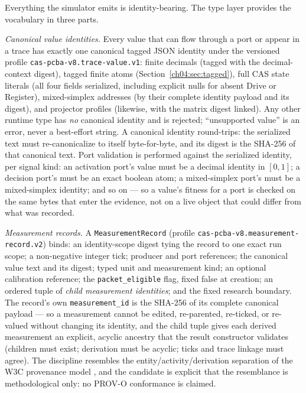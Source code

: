 Everything the simulator emits is identity-bearing. The type layer
provides the vocabulary in three parts.

\emph{Canonical value identities.} Every value that can flow through a
port or appear in a trace has exactly one canonical tagged JSON identity
under the versioned profile \texttt{cas-pcba-v8.trace-value.v1}: finite
decimals (tagged with the decimal-context digest), tagged finite atoms
(Section~\ref{ch04:sec:tagged}), full CAS state literals (all four fields
serialized, including explicit nulls for absent Drive or Register),
mixed-simplex addresses (by their complete identity payload and its
digest), and projector profiles (likewise, with the matrix digest linked).
Any other runtime type has \emph{no} canonical identity and is rejected;
``unsupported value'' is an error, never a best-effort string. A canonical
identity round-trips: the serialized text must re-canonicalize to itself
byte-for-byte, and its digest is the SHA-256 of that canonical text. Port
validation is performed against the serialized identity, per signal kind:
an activation port's value must be a decimal identity in $[0,1]$; a
decision port's must be an exact boolean atom; a mixed-simplex port's must
be a mixed-simplex identity; and so on --- so a value's fitness for a port
is checked on the same bytes that enter the evidence, not on a live object
that could differ from what was recorded.

\emph{Measurement records.} A \texttt{MeasurementRecord} (profile
\texttt{cas-pcba-v8.measurement-record.v2}) binds: an identity-scope
digest tying the record to one exact run scope; a non-negative integer
tick; producer and port references; the canonical value text and its
digest; typed unit and measurement kind; an optional calibration
reference; the \texttt{packet\_eligible} flag, fixed false at creation;
an ordered tuple of \emph{child measurement identities}; and the fixed
research boundary. The record's own \texttt{measurement\_id} is the
SHA-256 of its complete canonical payload --- so a measurement cannot be
edited, re-parented, re-ticked, or re-valued without changing its
identity, and the child tuple gives each derived measurement an explicit,
acyclic ancestry that the result constructor validates (children must
exist; derivation must be acyclic; ticks and trace linkage must agree).
The discipline resembles the entity/activity/derivation separation of the
W3C provenance model \cite{prov}, and the candidate is explicit that the
resemblance is methodological only: no PROV-O conformance is claimed.

